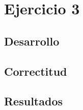  

	\section{Ejercicio 3}

    \subsection{Desarrollo}

    \pagebreak

    \subsection{Correctitud}
	

    \pagebreak


    \subsection{Resultados}

    \pagebreak
